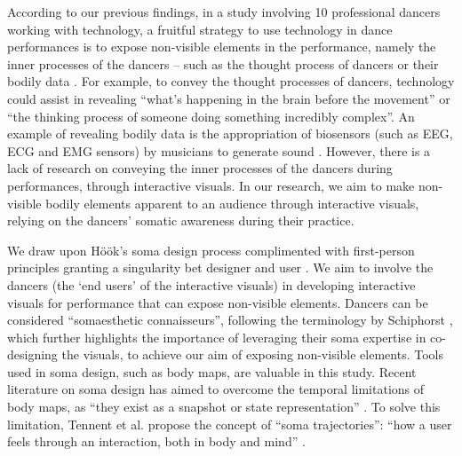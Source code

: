 According to our previous findings, in a study involving 10 professional dancers working with technology, a fruitful strategy to use technology in dance performances is to expose non-visible elements in the performance, namely the inner processes of the dancers – such as the thought process of dancers or their bodily data \cite{masu_how_2019}. For example, to convey the thought processes of dancers, technology could assist in revealing “what’s happening in the brain before the movement” or “the thinking process of someone doing something incredibly complex”. An example of revealing bodily data is the appropriation of biosensors (such as EEG, ECG and EMG sensors) by musicians to generate sound \cite{aly_appropriating_2021}. However, there is a lack of research on conveying the inner processes of the dancers during performances, through interactive visuals. In our research, we aim to make non-visible bodily elements apparent to an audience through interactive visuals, relying on the dancers’ somatic awareness during their practice.


We draw upon Höök's soma design process complimented with first-person principles granting a singularity bet designer and user \cite{hook_designing_2018}. We aim to involve the dancers (the ‘end users’ of the interactive visuals) in developing interactive visuals for performance that can expose non-visible elements. Dancers can be considered “somaesthetic connaisseurs”, following the terminology by Schiphorst \cite{schiphorst_self-evidence_2011}, which further highlights the importance of leveraging their soma expertise in co-designing the visuals, to achieve our aim of exposing non-visible elements. Tools used in soma design, such as body maps, are valuable in this study. Recent literature on soma design has aimed to overcome the temporal limitations of body maps, as “they exist as a snapshot or state representation” \cite{tennent_articulating_2021}. To solve this limitation, Tennent et al. propose the concept of “soma trajectories”: “how a user feels through an interaction, both in body and mind”  \cite{tennent_articulating_2021}.


